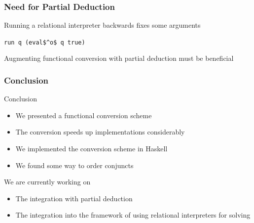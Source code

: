 \documentclass[xcolor=table, aspectratio=169]{beamer}
\begin{document}
\begin{frame}[fragile]
  \frametitle{Need for Partial Deduction}

\begin{center}
Running a relational interpreter backwards fixes some arguments
\end{center}

\begin{center}
\begin{minipage}{0.3\textwidth}
  \lstinline{run q (eval$^o$ q true)}
\end{minipage}

\vfill

\begin{center}
  Augmenting functional conversion with partial deduction must be beneficial
\end{center}
\end{center}


\end{frame}


\begin{frame}[fragile]
  \frametitle{Conclusion}
Conclusion
  \begin{itemize}
    \item We presented a functional conversion scheme
    \item The conversion speeds up implementations considerably
    \item We implemented the conversion scheme in Haskell
    \item We found some way to order conjuncts
  \end{itemize}

\vfill

We are currently working on
  \begin{itemize}
    \item The integration with partial deduction
    \item The integration into the framework of using relational interpreters for solving
  \end{itemize}
\end{frame}
\end{document}
